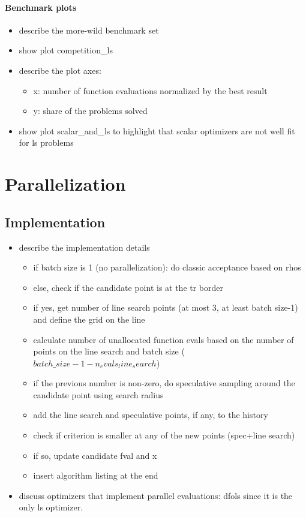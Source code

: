 \paragraph{Benchmark plots}
\begin{itemize}
    \item describe the more-wild benchmark set
    \item show plot competition\_ls
    \item describe the plot axes:
        \begin{itemize}
            \item x: number of function evaluations normalized by the best result
            \item y: share of the problems solved
        \end{itemize}
    \item show plot scalar\_and\_ls to highlight that scalar optimizers are not well fit for ls problems
\end{itemize}


\section{Parallelization}
\subsection{Implementation}
\begin{itemize}
\item describe the implementation details
\begin{itemize}
    \item if batch size is 1 (no parallelization): do classic acceptance based on rhos
    \item else, check if the candidate point is at the tr border
    \item if yes, get number of line search points (at most 3, at least batch size-1) and define the grid on the line
    \item calculate number of unallocated function evals based on the number of points on the line search and batch size ($batch\_size-1-n_evals_line_search$) 
    \item if the previous number is non-zero, do speculative sampling around the candidate point using search radius
    \item add the line search and speculative points, if any, to the history
    \item check if criterion is smaller at any of the new points (spec+line search)
    \item if so, update candidate fval and x
    \item insert algorithm listing at the end
\end{itemize}
\item discuss optimizers that implement parallel evaluations: dfols since it is the only ls optimizer.
\end{itemize}

